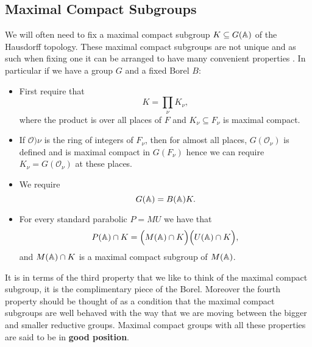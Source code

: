     \subsection{Maximal Compact Subgroups}\label{max_compact_subgroup}
    We will often need to fix a maximal compact subgroup \(K\subseteq G(\A)\) of the Hausdorff topology. These maximal compact subgroups are not unique and as such when fixing one it can be arranged to have many convenient properties \cite[I.1.4]{moeglinSpectralDecompositionEisenstein1995}. In particular if we have a group \(G\) and a fixed Borel \(B\):
    \begin{itemize}
        \item First require that 
        \[K = \prod_\nu K_\nu,\]
        where the product is over all places of \(F\) and \(K_\nu\subseteq F_\nu\) is maximal compact.
        \item If \(\mathcal{O})\nu\) is the ring of integers of \(F_\nu\), then for almost all places, \(G(\mathcal{O}_{\nu})\) is defined and is maximal compact in \(G(F_\nu)\) hence we can require \(K_\nu = G(\mathcal{O}_{\nu})\) at these places. 
        \item We require 
        \[G(\A) = B(\A)K.\]
        \item For every standard parabolic \(P = MU\) we have that 
        \[P(\A)\cap K = \Bigl( M(\A)\cap K \Bigr) \Bigl( U(\A)\cap K \Bigr),\]
        and \(M(\A)\cap K\) is a maximal compact subgroup of \(M(\A)\).
    \end{itemize}
     It is in terms of the third property that we like to think of the maximal compact subgroup, it is the complimentary piece of the Borel. Moreover the fourth property should be thought of as a condition that the maximal compact subgroups are well behaved with the way that we are moving between the bigger and smaller reductive groups.
    Maximal compact groups with all these properties are said to be in \textbf{good position}.
